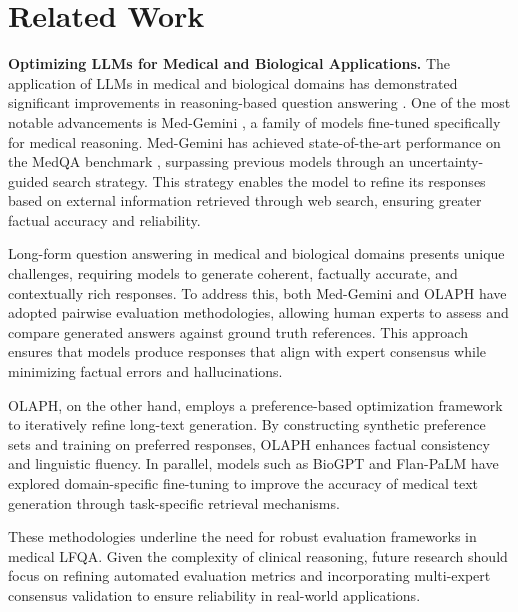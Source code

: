 \section{Related Work}
\textbf{Optimizing LLMs for Medical and Biological Applications.} The application of LLMs in medical and biological domains has demonstrated significant improvements in reasoning-based question answering \cite{mcduff2023accuratedifferentialdiagnosislarge, Singhal2023}. One of the most notable advancements is Med-Gemini \citet{saab2024capabilitiesgeminimodelsmedicine}, a family of models fine-tuned specifically for medical reasoning. Med-Gemini has achieved state-of-the-art performance on the MedQA benchmark \citep{saab2024capabilitiesgeminimodelsmedicine}, surpassing previous models through an uncertainty-guided search strategy. This strategy enables the model to refine its responses based on external information retrieved through web search, ensuring greater factual accuracy and reliability.

Long-form question answering in medical and biological domains presents unique challenges, requiring models to generate coherent, factually accurate, and contextually rich responses. To address this, both Med-Gemini \citep{saab2024capabilitiesgeminimodelsmedicine} and OLAPH \citep{jeong2024olaphimprovingfactualitybiomedical} have adopted pairwise evaluation methodologies, allowing human experts to assess and compare generated answers against ground truth references. This approach ensures that models produce responses that align with expert consensus while minimizing factual errors and hallucinations.

OLAPH, on the other hand, employs a preference-based optimization framework to iteratively refine long-text generation. By constructing synthetic preference sets and training on preferred responses, OLAPH enhances factual consistency and linguistic fluency. In parallel, models such as BioGPT \cite{Zhang_2024} and Flan-PaLM \cite{Singhal2023} have explored domain-specific fine-tuning to improve the accuracy of medical text generation through task-specific retrieval mechanisms.

These methodologies underline the need for robust evaluation frameworks in medical LFQA. Given the complexity of clinical reasoning, future research should focus on refining automated evaluation metrics and incorporating multi-expert consensus validation to ensure reliability in real-world applications.






